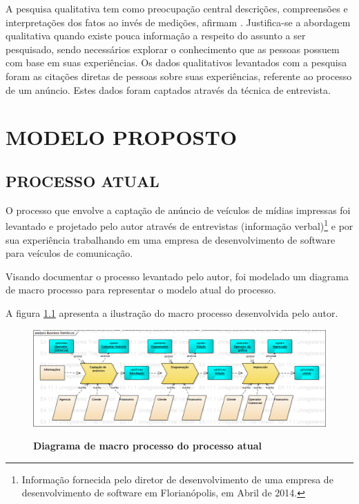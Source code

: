 \documentclass[
	12pt,				%
	openright,			%
	oneside,			%
	a4paper,			%
	chapter=TITLE,		%
	section=TITLE,		%
	english,			%
	french,				%
	spanish,			%
	brazil				%
	]{abntex2}
\begin{document}
A pesquisa qualitativa tem como preocupação central descrições, compreensões e interpretações dos fatos ao invés de medições, afirmam . Justifica-se a abordagem qualitativa quando existe pouca informação a respeito do assunto a ser pesquisado, sendo necessários explorar o conhecimento que as pessoas possuem com base em suas experiências. Os dados qualitativos levantados com a pesquisa foram as citações diretas de pessoas sobre suas experiências, referente ao processo de um anúncio. Estes dados foram captados através da técnica de entrevista.


\chapter{MODELO PROPOSTO}

\section{PROCESSO ATUAL}
O processo que envolve a captação de anúncio de veículos de mídias impressas foi levantado e projetado pelo autor através de entrevistas (informação verbal)\footnote{Informação fornecida pelo diretor de desenvolvimento de uma empresa de desenvolvimento de software em Florianópolis, em Abril de 2014.} e por sua experiência trabalhando em uma empresa de desenvolvimento de software para veículos de comunicação.

Visando documentar o processo levantado pelo autor, foi modelado um diagrama de macro processo para representar o modelo atual do processo.

A figura \ref{fig-diag-macroprocesso} apresenta a ilustração do macro processo desenvolvida pelo autor.

\begin{figure}[htb]
	\begin{center}
		\caption{
			\textbf{Diagrama de macro processo do processo atual}
		}\label{fig-diag-macroprocesso}
		\includegraphics [scale=0.4]{imagens/diagrama_macro_processo.png}
		\label{fig-diag-macroprocesso}
	\end{center}
\end{figure}
\end{document}
